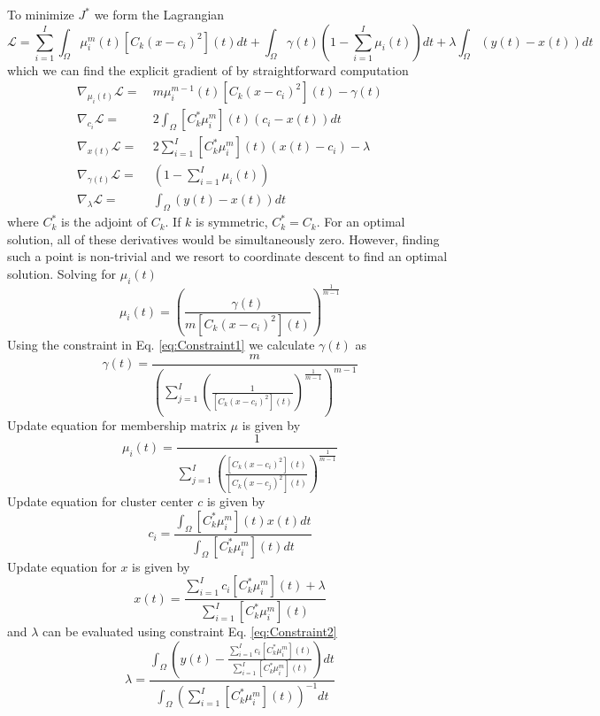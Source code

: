 \documentclass{llncs}
\begin{document}
To minimize $J^*$ we form the Lagrangian
\begin{equation}
\mathcal{L} =
\sum_{i=1}^{I} \int_\Omega {\mu_{i}^m}(t) [C_k (x - c_i)^2](t) dt
+
\int_\Omega \gamma(t) \left(1 - \sum_{i=1}^{I} \mu_i(t)\right) dt
+
\lambda \int_\Omega (y(t) - x(t)) dt
\end{equation}
which we can find the explicit gradient of by straightforward computation
\begin{align*}
\nabla_{\mu_i(t)} \mathcal{L}
=&\ 
m \mu_{i}^{m-1}(t) [C_k (x - c_i)^2](t)
-
\gamma(t)
\\
\nabla_{c_i} \mathcal{L}
=&\
2 \int_\Omega [C_k^* \mu_{i}^m](t) (c_i - x(t)) dt
\\
\nabla_{x(t)} \mathcal{L}
=&\
2 \sum_{i=1}^{I} [C_k^* \mu_{i}^m](t) (x(t) - c_i) - \lambda
\\
\nabla_{\gamma(t)} \mathcal{L}
=&\
\left(1 - \sum_{i=1}^{I} \mu_i(t)\right)
\\
\nabla_{\lambda} \mathcal{L}
=&\
\int_\Omega (y(t) - x(t)) dt
\end{align*}
where $C_k^*$ is the adjoint of $C_k$. If $k$ is symmetric, $C_k^* = C_k$.
For an optimal solution, all of these derivatives would be simultaneously zero. However, finding such a point is non-trivial and we resort to coordinate descent to find an optimal solution.
Solving for $\mu_{i}(t)$
\[
	\mu_{i}(t)=\left(\frac{\gamma(t)}{m[C_k (x - c_i)^2](t)}\right)^\frac{1}{m-1}
\]
Using the constraint in Eq. \ref{eq:Constraint1} we calculate $\gamma(t)$ as
\[
	\gamma(t)=\frac{m}{\left(\sum_{j=1}^I \left(\frac{1}{[C_k (x - c_i)^2](t)}\right)^\frac{1}{m-1}\right)^{m-1}}
\]
Update equation for membership matrix $\mu$ is given by
\begin{equation}
\label{eq:muUpdate}
\mu_{i}(t)=\frac{1}{\sum_{j=1}^I \left(\frac{[C_k (x - c_i)^2](t)}{[C_k (x - c_j)^2](t)}\right)^\frac{1}{m-1}}
\end{equation}
Update equation for cluster center $c$ is given by
\begin{equation}
\label{eq:ciUpdate}
c_i=
\frac{\int_\Omega [C_k^* \mu_{i}^m](t) x(t) dt}{\int_\Omega [C_k^* \mu_{i}^m](t)dt}
\end{equation}
Update equation for $x$ is given by
\begin{equation}
\label{eq:bkUpdate}
x(t)=
\frac{\sum_{i=1}^{I} c_i [C_k^* \mu_{i}^m](t) + \lambda}
{\sum_{i=1}^{I} [C_k^* \mu_{i}^m](t)}
\end{equation}
and $\lambda$ can be evaluated using constraint Eq. \ref{eq:Constraint2}
\begin{equation}
\lambda = 
\frac{\int_\Omega 
	\left(
	y(t)
	-
	\frac{\sum_{i=1}^{I} c_i [C_k^* \mu_{i}^m](t)}
	{\sum_{i=1}^{I} [C_k^* \mu_{i}^m](t)}
	\right)
	dt}{\int_\Omega
	\left(
	\sum_{i=1}^{I} [C_k^* \mu_{i}^m](t)
	\right)^{-1}
	dt}
\end{equation}
\end{document}
